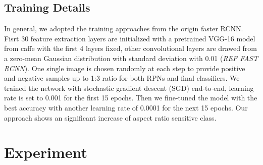 \documentclass[10pt,twocolumn,letterpaper]{article}
\begin{document}
\subsection{Training Details}
In general, we adopted the training approaches from the origin faster RCNN. Fisrt 30 feature extraction layers are initialized with a pretrained VGG-16 model from caffe with the first 4 layers fixed, other convolutional layers are drawed from a zero-mean Gaussian distribution with standard deviation with 0.01 (\emph{REF FAST RCNN}). One single image is chosen randomly at each step to provide positive and negative samples up to 1:3 ratio for both RPNs and final classifiers. We trained the network with stochastic gradient descent (SGD) end-to-end, learning rate is set to 0.001 for the first 15 epochs. Then we fine-tuned the model with the best accuracy with another learning rate of 0.0001 for the next 15 epochs. Our approach shows an significant increase of aspect ratio sensitive class.


\begin{table}[ht]
\label{Exp1}
\centering
\caption{Comparison}
\end{table}

\section{Experiment}
\end{document}
